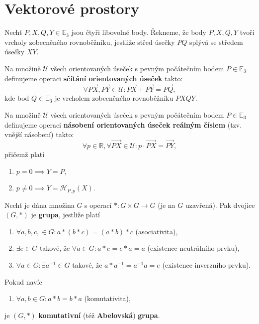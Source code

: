 \section{Vektorové prostory}
\begin{definition}
    Nechť $P, X, Q, Y\in \mathbb E_3$ jsou čtyři libovolné body. Řekneme, že body
    $P, X, Q, Y$ tvoří
    vrcholy zobecněného rovnoběžníku, jestliže střed úsečky $PQ$ splývá se středem úsečky
    $XY$.
\end{definition}

\begin{definition}
    Na množině $\mathscr U$ všech orientovaných úseček s pevným počátečním bodem
    $P\in \mathbb E_3$
    definujeme operaci \textbf{sčítání orientovaných úseček} takto:
    $$\forall \overrightarrow{PX}, \overrightarrow{PY} \in \mathscr U\colon
        \overrightarrow{PX} +  \overrightarrow{PY} = \overrightarrow{PQ},$$
    kde bod $Q\in \mathbb E_3$
    je vrcholem zobecněného rovnoběžníku $PXQY$.
\end{definition}

\begin{definition}
    Na množině $\mathscr U$ všech orientovaných úseček s pevným počátečním bodem
    $P\in \mathbb E_3$
    definujeme operaci \textbf{násobení orientovaných úseček reálným číslem}
    (tzv. vnější násobení) takto:
    $$\forall p\in \mathbb R, \forall \overrightarrow{PX}\in \mathscr U\colon p\cdot \overrightarrow{PX} = \overrightarrow{PY},$$
     přičemž platí
    \begin{enumerate}[$i.$]
    \item $p=0 \implies Y=P,$
   	\item $p\ne 0 \implies Y = \mathscr H_{P,p}(X).$
    \end{enumerate}
\end{definition}

\begin{definition}
    Nechť je dána množina $G$ s operací $*\colon G\times G \to G$ (je na $G$ uzavřená).
    Pak dvojice $(G,*)$ je \textbf{grupa}, jestliže platí
    \begin{enumerate}[$i.$]
        \item $\forall a,b,c, \in G\colon a*(b*c) = (a*b)*c$ (asociativita),
       	\item $\exists e \in G$ takové, že $\forall a\in G\colon a*e=e*a=a$ (existence neutrálního prvku),
       	\item $\forall a\in G\colon \exists a^{-1}\in G$ takové, že $a*a^{-1}=a^{-1}a=e$ (existence inverzního prvku).
    \end{enumerate}
    Pokud navíc
    \begin{enumerate}[$iv.$]
        \item $\forall a,b \in G\colon a*b=b*a$ (komutativita),
    \end{enumerate}
    je $(G,*)$ \textbf{komutativní} (též \textbf{Abelovská}) \textbf{grupa}.
\end{definition}

